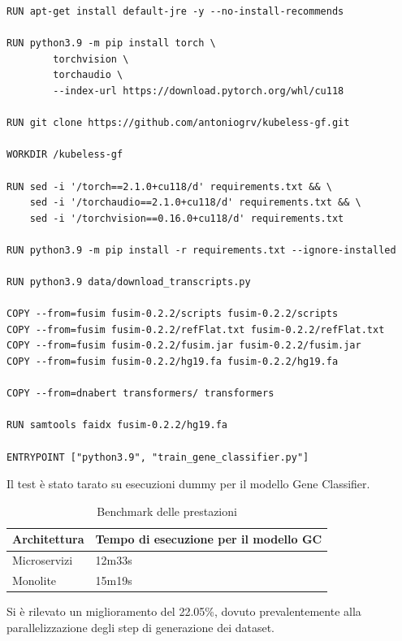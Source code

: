 \begin{code}
\begin{verbatim}
RUN apt-get install default-jre -y --no-install-recommends

RUN python3.9 -m pip install torch \
        torchvision \
        torchaudio \
        --index-url https://download.pytorch.org/whl/cu118

RUN git clone https://github.com/antoniogrv/kubeless-gf.git

WORKDIR /kubeless-gf

RUN sed -i '/torch==2.1.0+cu118/d' requirements.txt && \
    sed -i '/torchaudio==2.1.0+cu118/d' requirements.txt && \
    sed -i '/torchvision==0.16.0+cu118/d' requirements.txt

RUN python3.9 -m pip install -r requirements.txt --ignore-installed

RUN python3.9 data/download_transcripts.py

COPY --from=fusim fusim-0.2.2/scripts fusim-0.2.2/scripts
COPY --from=fusim fusim-0.2.2/refFlat.txt fusim-0.2.2/refFlat.txt
COPY --from=fusim fusim-0.2.2/fusim.jar fusim-0.2.2/fusim.jar
COPY --from=fusim fusim-0.2.2/hg19.fa fusim-0.2.2/hg19.fa

COPY --from=dnabert transformers/ transformers

RUN samtools faidx fusim-0.2.2/hg19.fa

ENTRYPOINT ["python3.9", "train_gene_classifier.py"]
\end{verbatim}
\end{code}

Il test è stato tarato su esecuzioni dummy per il modello Gene Classifier.

\begin{table}[h]
\centering
\caption*{Benchmark delle prestazioni}
\begin{tabular}{|l|l|}
\hline
\textbf{Architettura} & \textbf{Tempo di esecuzione per il modello GC} \\ \hline
Microservizi & 12m33s \\ \hline
Monolite & 15m19s \\ \hline
\end{tabular}
\end{table}

Si è rilevato un miglioramento del 22.05\%, dovuto prevalentemente alla parallelizzazione degli step di generazione dei dataset.